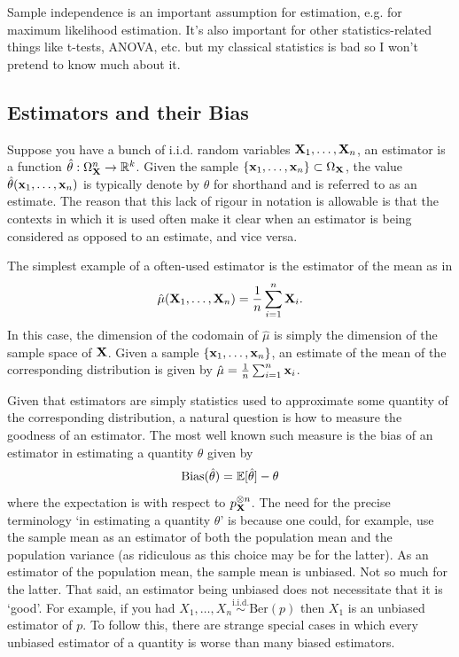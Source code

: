 \documentclass[11pt]{article}
\begin{document}
\begin{appendices}
Sample independence is an important assumption for estimation, e.g. for maximum likelihood estimation. It's also important for other statistics-related things like t-tests, ANOVA, etc. but my classical statistics is bad so I won't pretend to know much about it.

\subsection{Estimators and their Bias}
Suppose you have a bunch of i.i.d. random variables $\mathbf{X}_1,\dots,\mathbf{X}_n$, an estimator is a function $\hat{\theta}:\Omega_{\mathbf{X}}^n\to\mathbb{R}^k$. Given the sample $\{\mathbf{x}_1,\dots,\mathbf{x}_n\}\subset\Omega_{\mathbf{X}}$, the value $\hat{\theta}(\mathbf{x}_1,\dots,\mathbf{x}_n)$ is typically denote by $\hat{\theta}$ for shorthand and is referred to as an estimate. The reason that this lack of rigour in notation is allowable is that the contexts in which it is used often make it clear when an estimator is being considered as opposed to an estimate, and vice versa.

The simplest example of a often-used estimator is the estimator of the mean as in
$$
\hat{\mu}(\mathbf{X}_1,\dots,\mathbf{X}_n)
=
\frac{1}{n}\sum_{i=1}^n \mathbf{X}_i.
$$
In this case, the dimension of the codomain of $\hat{\mu}$ is simply the dimension of the sample space of $\mathbf{X}$. Given a sample $\{\mathbf{x}_1,\dots,\mathbf{x}_n\}$, an estimate of the mean of the corresponding distribution is given by $\hat{\mu}=\frac{1}{n}\sum_{i=1}^n\mathbf{x}_i$.

Given that estimators are simply statistics used to approximate some quantity of the corresponding distribution, a natural question is how to measure the goodness of an estimator. The most well known such measure is the bias of an estimator in estimating a quantity $\theta$ given by
$$
\text{Bias}(\hat{\theta})
=
\mathbb{E}[\hat{\theta}]-\theta
$$
where the expectation is with respect to $p_{\mathbf{X}}^{{\otimes}n}$. The need for the precise terminology `in estimating a quantity $\theta$' is because one could, for example, use the sample mean as an estimator of both the population mean and the population variance (as ridiculous as this choice may be for the latter). As an estimator of the population mean, the sample mean is unbiased. Not so much for the latter. That said, an estimator being unbiased does not necessitate that it is `good'. For example, if you had $X_1,\dots,X_n\overset{\text{i.i.d.}}{\sim}\text{Ber}(p)$ then $X_1$ is an unbiased estimator of $p$. To follow this, there are strange special cases in which every unbiased estimator of a quantity is worse than many biased estimators.


\end{appendices}
\end{document}
